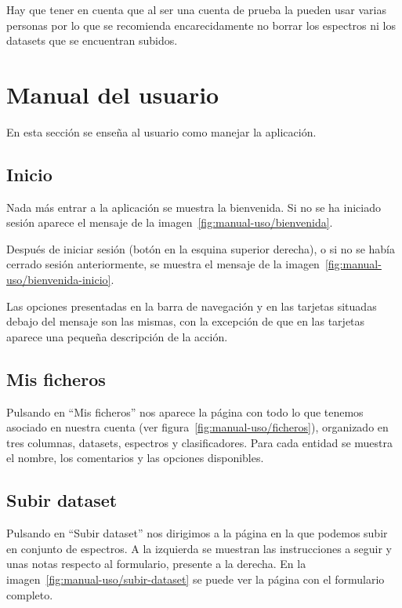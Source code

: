Hay que tener en cuenta que al ser una cuenta de prueba la pueden usar varias 
personas por lo que se recomienda encarecidamente no borrar los espectros ni 
los datasets que se encuentran subidos.

\section{Manual del usuario}

En esta sección se enseña al usuario como manejar la aplicación.

\subsection{Inicio}

Nada más entrar a la aplicación se muestra la bienvenida. Si no se ha iniciado 
sesión aparece el mensaje de la imagen~\ref{fig:manual-uso/bienvenida}.


Después de iniciar sesión (botón en la esquina superior derecha), o si no se 
había cerrado sesión anteriormente, se muestra el mensaje de la 
imagen~\ref{fig:manual-uso/bienvenida-inicio}.


Las opciones presentadas en la barra de navegación y en las tarjetas situadas 
debajo del mensaje son las mismas, con la excepción de que en las tarjetas 
aparece una pequeña descripción de la acción.

\subsection{Mis ficheros}

Pulsando en ``Mis ficheros'' nos aparece la página con todo lo que tenemos 
asociado en nuestra cuenta (ver figura~\ref{fig:manual-uso/ficheros}), 
organizado en tres columnas, datasets, espectros y clasificadores. Para cada 
entidad se muestra el nombre, los comentarios y las opciones disponibles.


\subsection{Subir dataset}

Pulsando en ``Subir dataset'' nos dirigimos a la página en la que podemos subir 
en conjunto de espectros. A la izquierda se muestran las instrucciones a seguir 
y unas notas respecto al formulario, presente a la derecha. En la 
imagen~\ref{fig:manual-uso/subir-dataset} se puede ver la página con el 
formulario completo.


